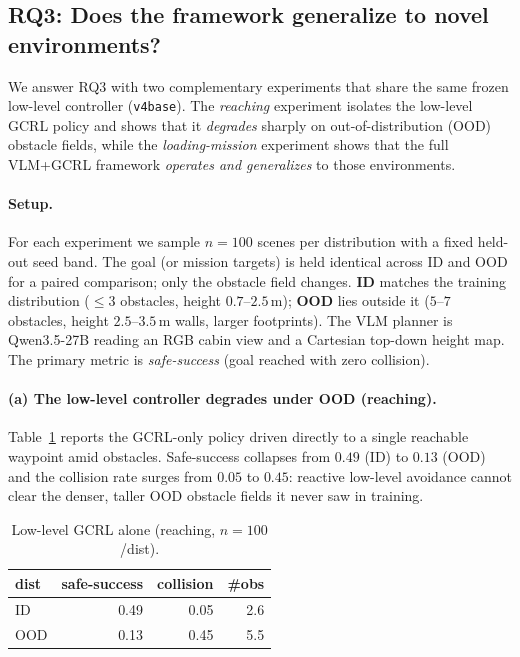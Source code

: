 \subsection{RQ3: Does the framework generalize to novel environments?}\label{subsec:rq3}

We answer RQ3 with two complementary experiments that share the same frozen low-level
controller (\texttt{v4base}). The \emph{reaching} experiment isolates the low-level GCRL policy
and shows that it \emph{degrades} sharply on out-of-distribution (OOD) obstacle fields, while the
\emph{loading-mission} experiment shows that the full VLM+GCRL framework \emph{operates and
generalizes} to those environments.

\paragraph{Setup.}
For each experiment we sample $n{=}100$ scenes per distribution with a fixed held-out seed band.
The goal (or mission targets) is held identical across ID and OOD for a paired comparison; only the
obstacle field changes. \textbf{ID} matches the training distribution ($\leq 3$ obstacles,
height $0.7$--$2.5$\,m); \textbf{OOD} lies outside it ($5$--$7$ obstacles, height $2.5$--$3.5$\,m walls,
larger footprints). The VLM planner is Qwen3.5-27B reading an RGB cabin view and a Cartesian
top-down height map. The primary metric is \emph{safe-success} (goal reached with zero collision).

\paragraph{(a) The low-level controller degrades under OOD (reaching).}
Table~\ref{tab:rq3-reach} reports the GCRL-only policy driven directly to a single reachable
waypoint amid obstacles. Safe-success collapses from $0.49$ (ID) to $0.13$ (OOD) and the collision
rate surges from $0.05$ to $0.45$: reactive low-level avoidance cannot clear the denser, taller
OOD obstacle fields it never saw in training.

\begin{table}[t]\centering
\caption{Low-level GCRL alone (reaching, $n{=}100$/dist).}\label{tab:rq3-reach}
\begin{tabular}{lrrr}
\toprule
dist & safe-success & collision & \#obs \\
\midrule
ID  & 0.49 & 0.05 & 2.6 \\
OOD & 0.13 & 0.45 & 5.5 \\
\bottomrule
\end{tabular}
\end{table}

